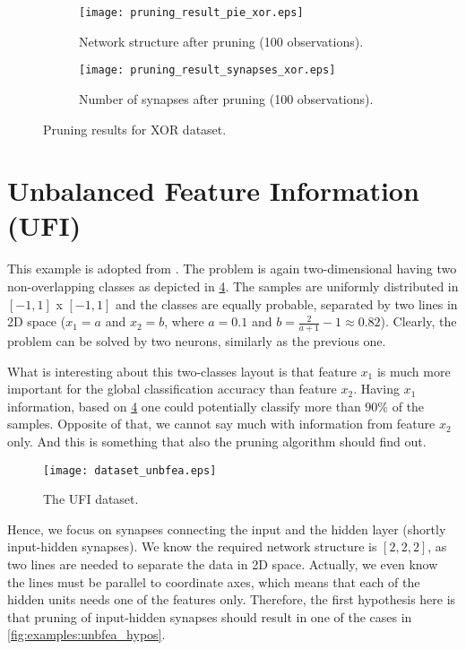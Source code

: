 \begin{figure}[H]
\centering
\begin{subfigure}{.4\textwidth}
  \centering
  \texttt{[image: pruning\_result\_pie\_xor.eps]}
  \caption{Network structure after pruning (100 observations).}
  \label{fig:examples:pie_xor}
\end{subfigure}
\begin{subfigure}{.4\textwidth}
  \centering
  \texttt{[image: pruning\_result\_synapses\_xor.eps]}
  \caption{Number of synapses after pruning (100 observations).}
  \label{fig:examples:result_synapses_xor}
\end{subfigure}
\caption{Pruning results for XOR dataset.}
\label{fig:examples:pruning_result_xor}
\end{figure}

\section{Unbalanced Feature Information (UFI)} \label{sec:example_ufi}
This example is adopted from \citep{karnin}. The problem is again two-dimensional having two non-overlapping classes as depicted in \cref{fig:examples:dataset_unbfea}. The samples are uniformly distributed in $ [-1, 1] $ x $ [-1, 1] $ and the classes are equally probable, separated by two lines in 2D space ($ x_1 = a $ and $ x_2 = b $, where $ a = 0.1 $ and $ b = \frac{2}{a+1} - 1 \approx 0.82 $). Clearly, the problem can be solved by two neurons, similarly as the previous one.

What is interesting about this two-classes layout is that feature $ x_1 $ is much more important for the global classification accuracy than feature $ x_2 $. Having $ x_1 $ information, based on \cref{fig:examples:dataset_unbfea} one could potentially classify more than $ 90\% $ of the samples. Opposite of that, we cannot say much with information from feature $ x_2 $ only. And this is something that also the pruning algorithm should find out.

\begin{figure}[H]
\centering
\texttt{[image: dataset\_unbfea.eps]}
\caption{The UFI dataset.}
\label{fig:examples:dataset_unbfea}
\end{figure}

Hence, we focus on synapses connecting the input and the hidden layer (shortly input-hidden synapses). We know the required network structure is $ [2, 2, 2] $, as two lines are needed to separate the data in 2D space. Actually, we even know the lines must be parallel to coordinate axes, which means that each of the hidden units needs one of the features only. Therefore, the first hypothesis here is that pruning of input-hidden synapses should result in one of the cases in \cref{fig:examples:unbfea_hypos}.

